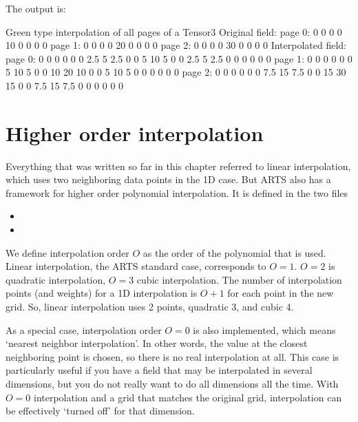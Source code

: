 \hspace{-\parindent}The output is:

\begin{code}
Green type interpolation of all pages of a Tensor3
Original field:
page 0:
  0   0   0
  0  10   0
  0   0   0
page 1:
  0   0   0
  0  20   0
  0   0   0
page 2:
  0   0   0
  0  30   0
  0   0   0
Interpolated field:
page 0:
  0   0   0   0   0
  0 2.5   5 2.5   0
  0   5  10   5   0
  0 2.5   5 2.5   0
  0   0   0   0   0
page 1:
  0   0   0   0   0
  0   5  10   5   0
  0  10  20  10   0
  0   5  10   5   0
  0   0   0   0   0
page 2:
  0   0   0   0   0
  0 7.5  15 7.5   0
  0  15  30  15   0
  0 7.5  15 7.5   0
  0   0   0   0   0
\end{code}


\section{Higher order interpolation}

Everything that was written so far in this chapter referred to linear
interpolation, which uses two neighboring data points in the 1D
case. But ARTS also has a framework for higher order polynomial
interpolation. It is defined in the two files

\begin{itemize}
\item {}
\item {}
\end{itemize}

We define interpolation order $O$ as the order of the polynomial that
is used. Linear interpolation, the ARTS standard case, corresponds to
$O=1$. $O=2$ is quadratic interpolation, $O=3$ cubic interpolation.
The number of interpolation points (and weights) for a 1D
interpolation is $O+1$ for each point in the new grid. So, linear
interpolation uses 2 points, quadratic 3, and cubic 4. 

As a special case, interpolation order $O=0$ is also implemented,
which means `nearest neighbor interpolation'. In other words, the
value at the closest neighboring point is chosen, so there is no real
interpolation at all. This case is particularly useful if you have a
field that may be interpolated in several dimensions, but you do not
really want to do all dimensions all the time. With $O=0$
interpolation and a grid that matches the original grid, interpolation
can be effectively `turned off' for that dimension.

